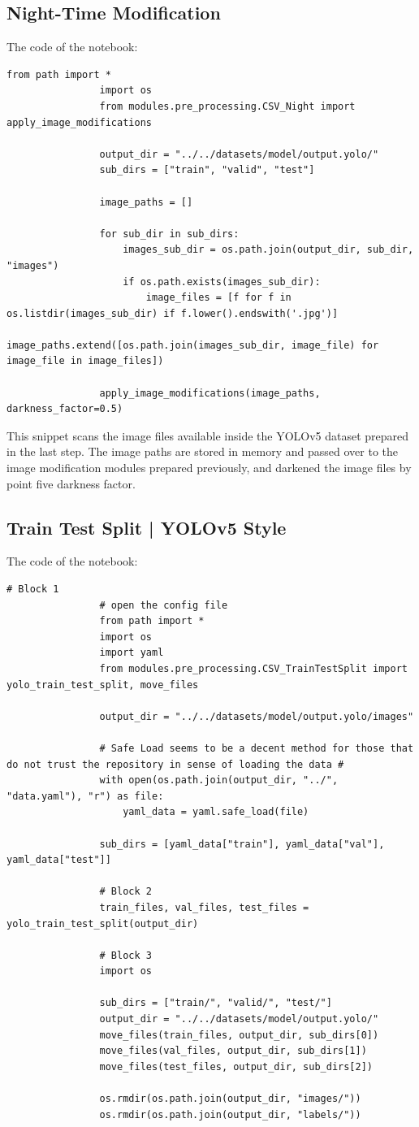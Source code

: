 \documentclass[12pt]{report} %
\begin{document}
		\subsection*{Night-Time Modification}
			The code of the notebook:
			\begin{lstlisting}[tabsize=1]
				from path import *
				import os
				from modules.pre_processing.CSV_Night import apply_image_modifications

				output_dir = "../../datasets/model/output.yolo/"
				sub_dirs = ["train", "valid", "test"]

				image_paths = []

				for sub_dir in sub_dirs:
					images_sub_dir = os.path.join(output_dir, sub_dir, "images")
					if os.path.exists(images_sub_dir):
						image_files = [f for f in os.listdir(images_sub_dir) if f.lower().endswith('.jpg')]
						image_paths.extend([os.path.join(images_sub_dir, image_file) for image_file in image_files])

				apply_image_modifications(image_paths, darkness_factor=0.5)
			\end{lstlisting}

			This snippet scans the image files available inside the YOLOv5 dataset prepared in the last step. The image paths are stored in memory and passed over to the image modification modules prepared previously, and darkened the image files by point five darkness factor.

		\subsection*{Train Test Split | YOLOv5 Style}
			The code of the notebook:
			\begin{lstlisting}[tabsize=1]
				# Block 1
				# open the config file
				from path import *
				import os
				import yaml
				from modules.pre_processing.CSV_TrainTestSplit import yolo_train_test_split, move_files

				output_dir = "../../datasets/model/output.yolo/images"

				# Safe Load seems to be a decent method for those that do not trust the repository in sense of loading the data #
				with open(os.path.join(output_dir, "../", "data.yaml"), "r") as file:
					yaml_data = yaml.safe_load(file)

				sub_dirs = [yaml_data["train"], yaml_data["val"], yaml_data["test"]]

				# Block 2
				train_files, val_files, test_files = yolo_train_test_split(output_dir)

				# Block 3
				import os

				sub_dirs = ["train/", "valid/", "test/"]
				output_dir = "../../datasets/model/output.yolo/"
				move_files(train_files, output_dir, sub_dirs[0])
				move_files(val_files, output_dir, sub_dirs[1])
				move_files(test_files, output_dir, sub_dirs[2])

				os.rmdir(os.path.join(output_dir, "images/"))
				os.rmdir(os.path.join(output_dir, "labels/"))
			\end{lstlisting}
\end{document}
